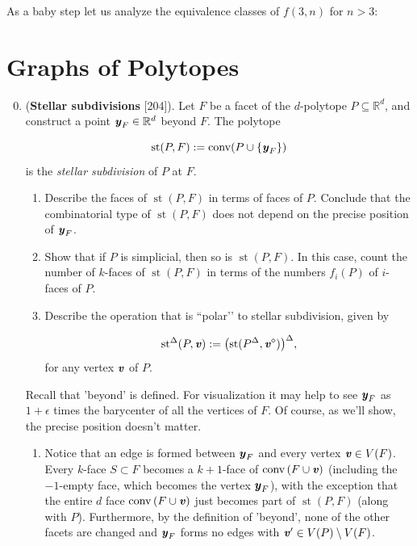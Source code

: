 \documentclass{article}
\begin{document}
\begin{enumerate}
\begin{solution}
    As a baby step let us analyze the equivalence classes of $f(3,n)$ for $n > 3$:

    
\end{solution}
\end{enumerate}

\bigskip
\section{Graphs of Polytopes}

\begin{enumerate}
\setcounter{enumi}{-1}
\renewcommand{\labelenumi}{3.\arabic{enumi}}
\item (\textbf{Stellar subdivisions}  [204]). Let $F$ be a facet of the $d$-polytope $P \subseteq \mathbb{R}^d$, and construct a point $\textbf{\textit{y}}_F \in \mathbb{R}^d$ beyond $F$. The polytope

\[\operatorname{st}(P,F) := \operatorname{conv}(P \cup \{\textbf{\textit{y}}_F\})\]
is the \textit{stellar subdivision} of $P$ at $F$.

\begin{enumerate}[label=(\roman*)]

\item Describe the faces of $\operatorname{st}(P,F)$ in terms of faces of $P$. Conclude that the combinatorial type of $\operatorname{st}(P,F)$ does not depend on the precise position of $\textbf{\textit{y}}_F$.

\item Show that if $P$ is simplicial, then so is $\operatorname{st}(P,F)$. In this case, count the number of $k$-faces of $\operatorname{st}(P,F)$ in terms of the numbers $f_i(P)$ of $i$-faces of $P$.

\item Describe the operation that is “polar’’ to stellar subdivision, given by

\[\operatorname{st}^\Delta(P,\textbf{\textit{v}}) := \bigl(\operatorname{st}(P^\Delta,\textbf{\textit{v}}^\diamond)\bigr)^\Delta,\]
for any vertex $\textbf{\textit{v}}$ of $P$.
\end{enumerate}

\begin{remark}
    Recall that 'beyond' is defined. For visualization it may help to see $\textbf{\textit{y}}_F$ as $1+\epsilon$ times the barycenter of all the vertices of $F$. Of course, as we'll show, the precise position doesn't matter.
\end{remark}
\begin{solution}
\begin{enumerate}[label=(\roman*)]
\item Notice that an edge is formed between $\textbf{\textit{y}}_F$ and every vertex $\textbf{\textit{v}} \in V(F)$. Every $k$-face $S \subset F$ becomes a $k+1$-face of $\operatorname{conv}{(F \cup \textbf{\textit{v}})}$ (including the $-1$-empty face, which becomes the vertex $\textbf{\textit{y}}_F$), with the exception that the entire $d$ face $\operatorname{conv}{(F \cup \textbf{\textit{v}})}$ just becomes part of $\operatorname{st}(P,F)$ (along with $P$). Furthermore, by the definition of 'beyond', none of the other facets are changed and $\textbf{\textit{y}}_F$ forms no edges with $\textbf{\textit{v}}' \in V(P)\setminus V(F)$.


\end{enumerate}
\end{solution}
\end{enumerate}
\end{document}
